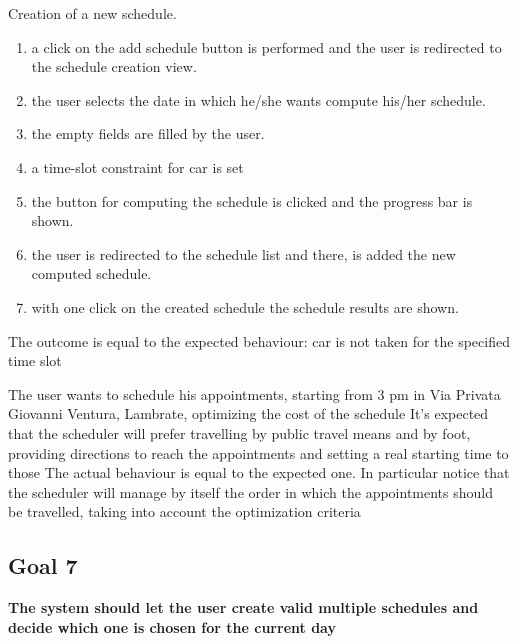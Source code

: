 
{Creation of a new schedule.}
{{\begin{enumerate}
\item a click on the add schedule button is performed and the user is redirected to the schedule creation view.
\item the user selects the date in which he/she wants compute his/her schedule.
\item the empty fields are filled by the user.
\item a time-slot constraint for car is set
\item the button for computing the schedule is clicked and the progress bar is shown.
\item the user is redirected to the schedule list and there, is added the new computed schedule.
\item with one click on the created schedule the schedule results are shown.
\end{enumerate}}}
{The outcome is equal to the expected behaviour: car is not taken for the specified time slot}


{The user wants to schedule his appointments, starting from 3 pm in Via Privata Giovanni Ventura, Lambrate, optimizing the cost of the schedule}
{It's expected that the scheduler will prefer travelling by public travel means and by foot, providing directions to reach the appointments and setting a real starting time to those}
{The actual behaviour is equal to the expected one. In particular notice   that the scheduler will manage by itself the order in which the appointments should be travelled, taking into account the optimization criteria}


\subsection{Goal 7}
\textbf{The system should let the user create valid multiple schedules and decide which one is chosen for the current day}\\


